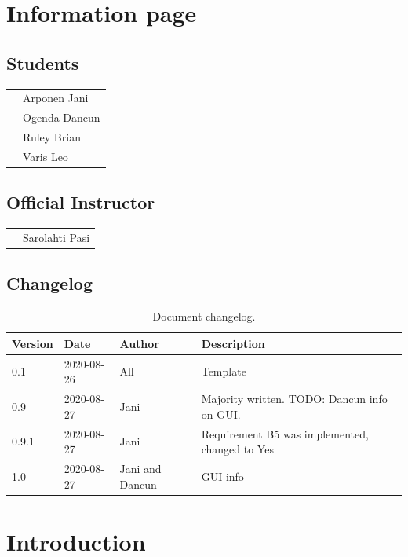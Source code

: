\section{Information page}
\subsection*{Students}
\begin{tabular}{ll}
   & Arponen Jani \\
   & Ogenda Dancun \\
   & Ruley Brian \\
   & Varis Leo \\
\end{tabular}

\subsection*{Official Instructor}
\begin{tabular}{ll}
   & Sarolahti Pasi \\
\end{tabular}



\subsection*{Changelog}
\begin{table}[!h]
\small{
\begin{tabular}{l|l|l|l}
\textbf{Version} & \textbf{Date} & \textbf{Author} & \textbf{Description} \\
\hline
0.1 & 2020-08-26 & All & Template \\
0.9 & 2020-08-27 & Jani & Majority written. TODO: Dancun info on GUI.\\
0.9.1 & 2020-08-27 & Jani & Requirement B5 was implemented, changed to Yes \\
1.0 & 2020-08-27 & Jani and Dancun & GUI info 
\end{tabular}
}
\caption{Document changelog.}
\label{table:changelog}
\end{table}


\newpage 
\tableofcontents

\newpage
\section{Introduction} 

